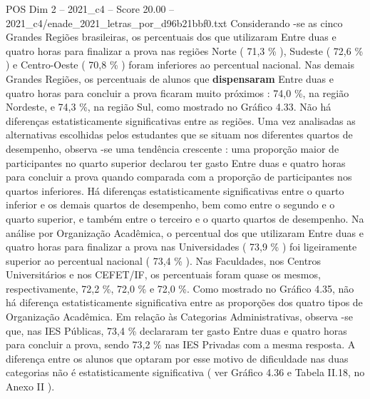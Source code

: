 \begin{textsample}{POS Dim 2 – 2021\_c4 – Score 20.00 – 2021\_c4/enade\_2021\_letras\_por\_d96b21bbf0.txt}
Considerando -se as cinco Grandes Regiões brasileiras, os percentuais dos que utilizaram Entre duas e quatro horas para finalizar a prova nas regiões Norte ( 71,3 \% ), Sudeste ( 72,6 \% ) e Centro-Oeste ( 70,8 \% ) foram inferiores ao percentual nacional.
Nas demais Grandes Regiões, os percentuais de alunos que \textbf{dispensaram} Entre duas e quatro horas para concluir a prova ficaram muito próximos : 74,0 \%, na região Nordeste, e 74,3 \%, na região Sul, como mostrado no Gráfico 4.33.
Não há diferenças estatisticamente significativas entre as regiões.
Uma vez analisadas as alternativas escolhidas pelos estudantes que se situam nos diferentes quartos de desempenho, observa -se uma tendência crescente : uma proporção maior de participantes no quarto superior declarou ter gasto Entre duas e quatro horas para concluir a prova quando comparada com a proporção de participantes nos quartos inferiores.
Há diferenças estatisticamente significativas entre o quarto inferior e os demais quartos de desempenho, bem como entre o segundo e o quarto superior, e também entre o terceiro e o quarto quartos de desempenho.
Na análise por Organização Acadêmica, o percentual dos que utilizaram Entre duas e quatro horas para finalizar a prova nas Universidades ( 73,9 \% ) foi ligeiramente superior ao percentual nacional ( 73,4 \% ).
Nas Faculdades, nos Centros Universitários e nos CEFET/IF, os percentuais foram quase os mesmos, respectivamente, 72,2 \%, 72,0 \% e 72,0 \%.
Como mostrado no Gráfico 4.35, não há diferença estatisticamente significativa entre as proporções dos quatro tipos de Organização Acadêmica.
Em relação às Categorias Administrativas, observa -se que, nas IES Públicas, 73,4 \% declararam ter gasto Entre duas e quatro horas para concluir a prova, sendo 73,2 \% nas IES Privadas com a mesma resposta.
A diferença entre os alunos que optaram por esse motivo de dificuldade nas duas categorias não é estatisticamente significativa ( ver Gráfico 4.36 e Tabela II.18, no Anexo II ).

\end{textsample}

